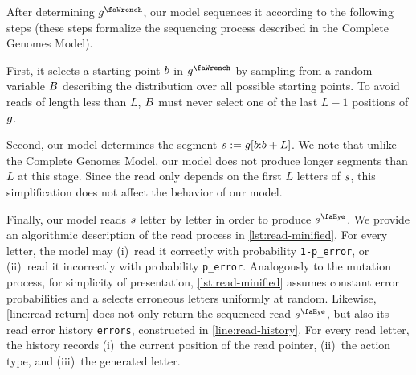 After determining $\genome^\gmut$, our model sequences it according to the following steps (these steps formalize the sequencing process described in the Complete Genomes Model).

First, it selects a starting point $b$ in $\genome^\gmut$ by sampling from a random variable $B$ describing the distribution over all possible starting points.
To avoid reads of length less than $L$, $B$ must never select one of the last $L-1$ positions of $g$.

Second, our model determines the segment $s := g[b {:} b+L]$.
We note that unlike the Complete Genomes Model, our model does not produce longer segments than $L$ at this stage.
Since the read only depends on the first $L$ letters of $s$, this simplification does not affect the behavior of our model.

\begin{figure}
	
\end{figure}

Finally, our model reads $s$ letter by letter in order to produce $\segment^\gread$.
We provide an algorithmic description of the read process in \cref{lst:read-minified}.
For every letter, the model may (i)~read it correctly with probability \texttt{1-p\_error}, or (ii)~read it incorrectly with probability \texttt{p\_error}.
Analogously to the mutation process, for simplicity of presentation, \cref{lst:read-minified} assumes constant error probabilities and a selects erroneous letters uniformly at random.
Likewise, \cref{line:read-return} does not only return the sequenced read $\segment^\gread$, but also its read error history \texttt{errors}, constructed in \cref{line:read-history}.
For every read letter, the history records (i)~the current position of the read pointer, (ii)~the action type, and (iii)~the generated letter.



